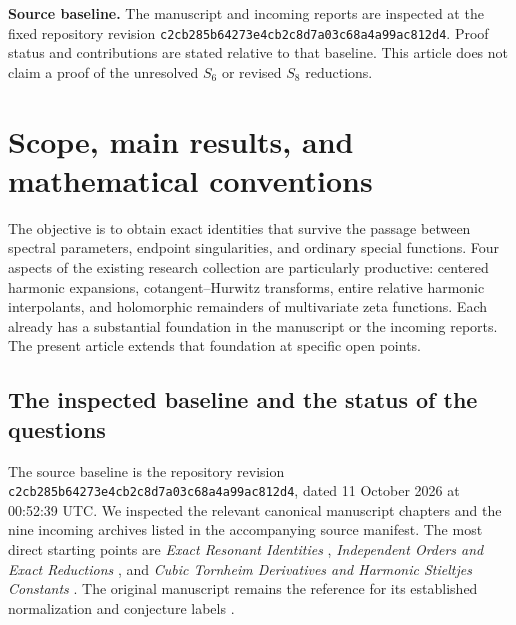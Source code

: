 \documentclass[11pt,a4paper]{article}
\numberwithin{equation}{section}
\theoremstyle{definition}
\theoremstyle{remark}
\newcommand{\snapshot}{\texttt{c2cb285b64273e4cb2c8d7a03c68a4a99ac812d4}}
\begin{document}
\begin{titlepage}
\begin{abstract}
Finally, every admissible quartic Tornheim ray is reduced to three
specified coordinates, and cyclic quartic combinations retain only
the diagonal coordinate. At all degrees we determine the exact
homogeneous freedom under the stated symmetry, axis, and Euler-plane
relations. An explicit deformation proves why diagonal data cease
to determine the cyclic fifth layer. The article includes complete
proofs, a source audit and integration notes, reproducible exact and numerical
checks, and a concrete further-research agenda.
\end{abstract}


\vfill
\noindent\textbf{Source baseline.}
The manuscript and incoming reports are inspected at the fixed repository
revision \snapshot. Proof status and contributions are stated relative to
that baseline. This article does not claim a proof of the unresolved
$S_6$ or revised $S_8$ reductions.
\end{titlepage}
\tableofcontents
\clearpage

\section{Scope, main results, and mathematical conventions}
\label{scope:section}

The objective is to obtain exact identities that survive the passage
between spectral parameters, endpoint singularities, and ordinary
special functions. Four aspects of the existing research collection
are particularly productive: centered harmonic expansions,
cotangent--Hurwitz transforms, entire relative harmonic interpolants,
and holomorphic remainders of multivariate zeta functions. Each already
has a substantial foundation in the manuscript or the incoming reports.
The present article extends that foundation at specific open points.

\subsection{The inspected baseline and the status of the questions}

The source baseline is the repository revision \snapshot,
dated 11 October 2026 at 00:52:39 UTC. We inspected the relevant
canonical manuscript chapters and the nine incoming archives listed
in the accompanying source manifest. The most direct starting points
are \emph{Exact Resonant Identities} \cite{ghp:ExactResonant},
\emph{Independent Orders and Exact Reductions} \cite{qtr:Independent},
and \emph{Cubic Tornheim Derivatives and Harmonic Stieltjes
Constants} \cite{source:Cubic}. The original manuscript remains
the reference for its established normalization and conjecture labels
\cite{source:manuscript}.
\end{document}
